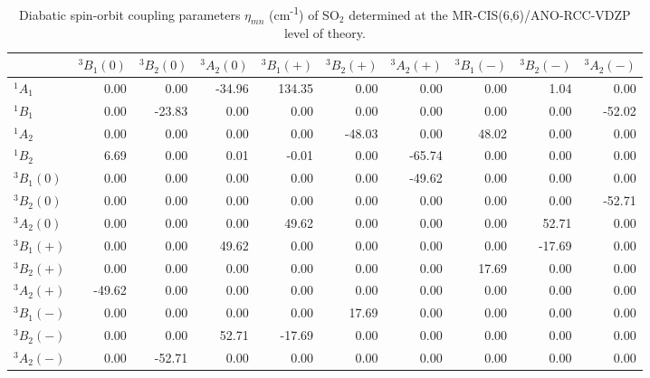 \documentclass[journal=jpclcd,manuscript=article
]{achemso}
\begin{document}
 \begin{table*}[h!]
 \caption{Diabatic spin-orbit coupling parameters $\eta_{mn}$ (cm\textsuperscript{-1}) of SO$_2$ determined at the MR-CIS(6,6)/ANO-RCC-VDZP level of theory.}

\begin{tabular}{l||rrr|rrr|rrr}
\hline
 & $^3B_1(0)$ & $^3B_2(0)$ & $^3A_2(0)$ & $^3B_1(+)$ & $^3B_2(+)$ & $^3A_2(+)$ & $^3B_1(-)$ & $^3B_2(-)$ & $^3A_2(-)$ \\ 
\hline\hline
$^1A_1$ & 0.00 & 0.00 & -34.96 & 134.35 & 0.00 & 0.00 & 0.00 & 1.04 & 0.00 \\ 
$^1B_1$ & 0.00 & -23.83 & 0.00 & 0.00 & 0.00 & 0.00 & 0.00 & 0.00 & -52.02 \\ 
$^1A_2$ & 0.00 & 0.00 & 0.00 & 0.00 & -48.03 & 0.00 & 48.02 & 0.00 & 0.00 \\ 
$^1B_2$ & 6.69 & 0.00 & 0.01 & -0.01 & 0.00 & -65.74 & 0.00 & 0.00 & 0.00 \\ 
\hline\hline
$^3B_1(0)$ & 0.00 & 0.00 & 0.00 & 0.00 & 0.00 & -49.62 & 0.00 & 0.00 & 0.00 \\ 
$^3B_2(0)$ & 0.00 & 0.00 & 0.00 & 0.00 & 0.00 & 0.00 & 0.00 & 0.00 & -52.71 \\ 
$^3A_2(0)$ & 0.00 & 0.00 & 0.00 & 49.62 & 0.00 & 0.00 & 0.00 & 52.71 & 0.00 \\ 
\hline
$^3B_1(+)$ & 0.00 & 0.00 & 49.62 & 0.00 & 0.00 & 0.00 & 0.00 & -17.69 & 0.00 \\ 
$^3B_2(+)$ & 0.00 & 0.00 & 0.00 & 0.00 & 0.00 & 0.00 & 17.69 & 0.00 & 0.00 \\ 
$^3A_2(+)$ & -49.62 & 0.00 & 0.00 & 0.00 & 0.00 & 0.00 & 0.00 & 0.00 & 0.00 \\ 
\hline
$^3B_1(-)$ & 0.00 & 0.00 & 0.00 & 0.00 & 17.69 & 0.00 & 0.00 & 0.00 & 0.00 \\ 
$^3B_2(-)$ & 0.00 & 0.00 & 52.71 & -17.69 & 0.00 & 0.00 & 0.00 & 0.00 & 0.00 \\ 
$^3A_2(-)$ & 0.00 & -52.71 & 0.00 & 0.00 & 0.00 & 0.00 & 0.00 & 0.00 & 0.00 \\ 

\hline
 \end{tabular}
 \end{table*}
\end{document}
